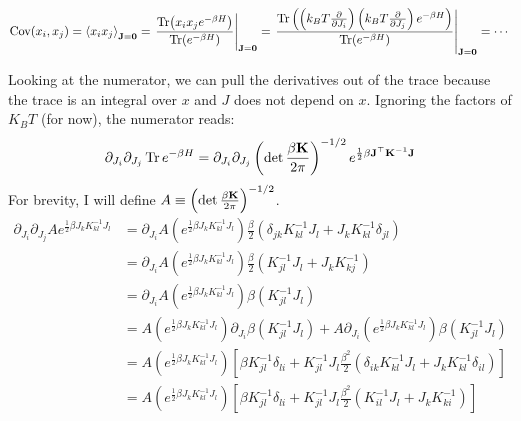 \documentclass[a4paper,twoside]{article}
\begin{document}
\begin{itemize}
        \begin{equation}
            \text{Cov}(x_i, x_j) = \ev{x_i x_j}_{\vb{J} = \vb{0}} = \eval{\frac{\Tr(x_i x_j e^{- \beta H})}{\Tr(e^{- \beta H})}}_{\vb{J} = \vb{0}} = \eval{\frac{\Tr \left( \left( k_B T \pdv{J_i} \right) \left( k_B T \pdv{J_j} \right) e^{- \beta H} \right)}{\Tr(e^{- \beta H})}}_{\vb{J} = \vb{0}} = \cdots
        \end{equation}
        \begin{problem}
            Looking at the numerator, we can pull the derivatives out of the trace because the trace is an integral over $ x $ and $ J $ does not depend on $ x $. Ignoring the factors of $ K_B T $ (for now), the numerator reads:
            \begin{equation}
                \partial_{J_i} \partial_{J_j} \Tr e^{- \beta H} = \partial_{J_i} \partial_{J_j} \left( \det \frac{\beta \vb{K}}{2 \pi} \right)^{-1/2} e^{\frac{1}{2} \beta \vb{J}^\top \vb{K}^{-1} \vb{J}}
            \end{equation}
            For brevity, I will define $ A \equiv \left( \det \frac{\beta \vb{K}}{2 \pi} \right)^{-1/2} $.
            \begin{align}
                \partial_{J_i} \partial_{J_j} A e^{\frac{1}{2} \beta J_k K_{kl}^{-1} J_l} &= \partial_{J_i} A \left( e^{\frac{1}{2} \beta J_k K_{kl}^{-1} J_l} \right) \frac{\beta}{2} \left( \delta_{jk} K_{kl}^{-1} J_l + J_k K_{kl}^{-1} \delta_{jl} \right)\\
                &= \partial_{J_i} A \left( e^{\frac{1}{2} \beta J_k K_{kl}^{-1} J_l} \right) \frac{\beta}{2} \left( K_{jl}^{-1} J_l + J_k K_{kj}^{-1} \right) \\
                &= \partial_{J_i} A \left( e^{\frac{1}{2} \beta J_k K_{kl}^{-1} J_l} \right) \beta (K_{jl}^{-1} J_l) \\
                &= A \left( e^{\frac{1}{2} \beta J_k K_{kl}^{-1} J_l} \right) \partial_{J_i}\beta (K_{jl}^{-1} J_l) + A \partial_{J_i} \left( e^{\frac{1}{2} \beta J_k K_{kl}^{-1} J_l} \right) \beta (K_{jl}^{-1} J_l) \\
                &= A \left( e^{\frac{1}{2} \beta J_k K_{kl}^{-1} J_l} \right) \left[ \beta K_{jl}^{-1} \delta_{li} + K_{jl}^{-1} J_l \frac{\beta^2}{2} (\delta_{ik} K_{kl}^{-1} J_l + J_k K_{kl}^{-1} \delta_{il}) \right] \\
                &= A \left( e^{\frac{1}{2} \beta J_k K_{kl}^{-1} J_l} \right) \left[ \beta K_{jl}^{-1} \delta_{li} + K_{jl}^{-1} J_l \frac{\beta^2}{2} (K_{il}^{-1} J_l + J_k K_{ki}^{-1})\right] \\

\end{align}
\end{problem}
\end{itemize}
\end{document}
